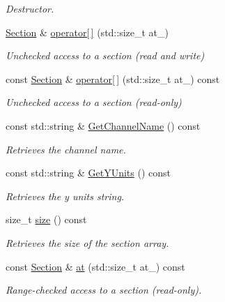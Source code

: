 \begin{DoxyCompactItemize}
\begin{DoxyCompactList}\small\item\em Destructor. \item\end{DoxyCompactList}\item 
\hyperlink{classSection}{Section} \& \hyperlink{classChannel_a00bfc4162f9a4febff18bd32db7ba238}{operator\mbox{[}$\,$\mbox{]}} (std::size\_\-t at\_\-)
\begin{DoxyCompactList}\small\item\em Unchecked access to a section (read and write) \item\end{DoxyCompactList}\item 
const \hyperlink{classSection}{Section} \& \hyperlink{classChannel_a507d1567e157f080c259b71c8ff214d6}{operator\mbox{[}$\,$\mbox{]}} (std::size\_\-t at\_\-) const 
\begin{DoxyCompactList}\small\item\em Unchecked access to a section (read-\/only) \item\end{DoxyCompactList}\item 
const std::string \& \hyperlink{classChannel_a009b30c9871d77b306d0c42986a1869a}{GetChannelName} () const 
\begin{DoxyCompactList}\small\item\em Retrieves the channel name. \item\end{DoxyCompactList}\item 
const std::string \& \hyperlink{classChannel_a808344243b3730730e0c541d529b803d}{GetYUnits} () const 
\begin{DoxyCompactList}\small\item\em Retrieves the y units string. \item\end{DoxyCompactList}\item 
size\_\-t \hyperlink{classChannel_a85706062035b7c436b41695e3a1fe0f8}{size} () const 
\begin{DoxyCompactList}\small\item\em Retrieves the size of the section array. \item\end{DoxyCompactList}\item 
const \hyperlink{classSection}{Section} \& \hyperlink{classChannel_a5c3ee4edf1450054f99d67413d5ff7c6}{at} (std::size\_\-t at\_\-) const 
\begin{DoxyCompactList}\small\item\em Range-\/checked access to a section (read-\/only). \item\end{DoxyCompactList}\item 

\end{DoxyCompactItemize}
